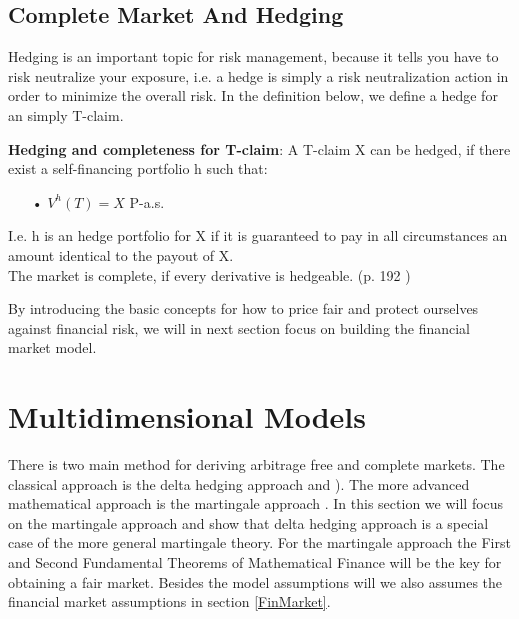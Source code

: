 \subsection{Complete Market And Hedging}
Hedging is an important topic for risk management, because it tells you have to risk neutralize your exposure, i.e. a hedge is simply a risk neutralization action in order to minimize the overall risk. In the definition below, we define a hedge for an simply T-claim.
\theoremstyle{definition}
\begin{definition}{\textbf{Hedging and completeness for T-claim}:}
A T-claim X can be hedged, if there exist a self-financing portfolio h such that:
\begin{enumerate}
\item[•] $V^{h}(T)=X$ P-a.s.
\end{enumerate}
I.e. h is an hedge portfolio for X if it is guaranteed to pay in all circumstances an amount identical to the payout of X.\\
The market is complete, if every derivative is hedgeable.
(p. 192 \parencite{finKont})
\end{definition}
By introducing the basic concepts for how to price fair and protect ourselves against financial risk, we will in next section focus on building the financial market model.


\section{Multidimensional Models}\label{MultiDimModel}
There is two main method for deriving arbitrage free and complete markets. The classical approach is the delta hedging approach \parencite{B-S-Paper} and \parencite{CRR}). The more advanced mathematical approach is the martingale approach  \parencite{finKont}. In this section we will focus on the martingale approach and show that delta hedging approach is a special case of the more general martingale theory. For the martingale approach the First and Second Fundamental Theorems of Mathematical Finance will be the key for obtaining a fair market. Besides the model assumptions will we also assumes the financial market assumptions in section \ref{FinMarket}.

